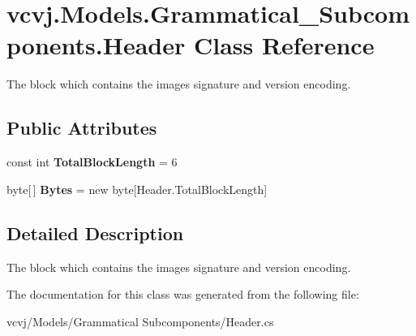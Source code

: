\hypertarget{classvcvj_1_1_models_1_1_grammatical___subcomponents_1_1_header}{}\section{vcvj.\+Models.\+Grammatical\+\_\+\+Subcomponents.\+Header Class Reference}
\label{classvcvj_1_1_models_1_1_grammatical___subcomponents_1_1_header}


The block which contains the image\textquotesingle{}s signature and version encoding.  


\subsection*{Public Attributes}
\begin{DoxyCompactItemize}
\item 
const int {\bfseries Total\+Block\+Length} = 6\hypertarget{classvcvj_1_1_models_1_1_grammatical___subcomponents_1_1_header_a4c41af980a2ee54f9d435dce794bbc23}{}\label{classvcvj_1_1_models_1_1_grammatical___subcomponents_1_1_header_a4c41af980a2ee54f9d435dce794bbc23}

\item 
byte\mbox{[}$\,$\mbox{]} {\bfseries Bytes} = new byte\mbox{[}Header.\+Total\+Block\+Length\mbox{]}\hypertarget{classvcvj_1_1_models_1_1_grammatical___subcomponents_1_1_header_a16d44e9018738a6b01d61a46015059be}{}\label{classvcvj_1_1_models_1_1_grammatical___subcomponents_1_1_header_a16d44e9018738a6b01d61a46015059be}

\end{DoxyCompactItemize}


\subsection{Detailed Description}
The block which contains the image\textquotesingle{}s signature and version encoding. 



The documentation for this class was generated from the following file\+:\begin{DoxyCompactItemize}
\item 
vcvj/\+Models/\+Grammatical Subcomponents/Header.\+cs\end{DoxyCompactItemize}
